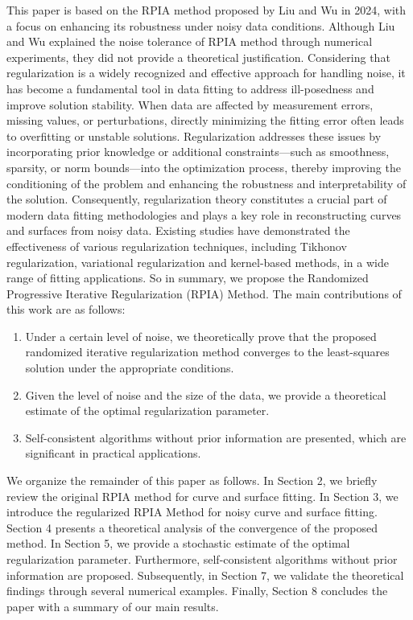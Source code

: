 \documentclass[11pt]{article}
\numberwithin{equation}{section}
\begin{document}
This paper is based on the RPIA method proposed by Liu and Wu\cite{WU2024128669} in 2024, with a focus on enhancing its robustness under noisy data conditions. Although Liu and Wu explained the noise tolerance of RPIA method through numerical experiments, they did not provide a theoretical justification. Considering that regularization is a widely recognized and effective approach for handling noise, it has become a fundamental tool in data fitting to address ill-posedness and improve solution stability\cite{MONTEGRANARIO2007583}. When data are affected by measurement errors, missing values, or perturbations, directly minimizing the fitting error often leads to overfitting or unstable solutions. Regularization addresses these issues by incorporating prior knowledge or additional constraints—such as smoothness, sparsity, or norm bounds—into the optimization process, thereby improving the conditioning of the problem and enhancing the robustness and interpretability of the solution. Consequently, regularization theory constitutes a crucial part of modern data fitting methodologies and plays a key role in reconstructing curves and surfaces from noisy data. Existing studies have demonstrated the effectiveness of various regularization techniques, including Tikhonov regularization\cite{Calvetti2025DistributedTR}, variational regularization\cite{Buccini2021AVN,Zhang2022ImpulseNI} and kernel-based methods\cite{Yin2020CurveFO}, in a wide range of fitting applications. So in summary, we propose the Randomized Progressive Iterative Regularization (RPIA) Method. The main contributions of this work are as follows:

\begin{enumerate}
\item Under a certain level of noise, we theoretically prove that the proposed randomized iterative regularization method converges to the least-squares solution under the appropriate conditions.
\item Given the level of noise and the size of the data, we provide a theoretical estimate of the optimal regularization parameter. 
\item Self-consistent algorithms without prior information are presented, which are significant in practical applications.
\end{enumerate}

We organize the remainder of this paper as follows. In Section 2, we briefly review the original RPIA method for curve and surface fitting. In Section 3, we introduce the  regularized RPIA Method for noisy curve and surface fitting. Section 4 presents a theoretical analysis of the convergence of the proposed method. In Section 5, we provide a stochastic estimate of the optimal regularization parameter. Furthermore, self-consistent algorithms without prior information are proposed. Subsequently, in Section 7, we validate the theoretical findings through several numerical examples. Finally, Section 8 concludes the paper with a summary of our main results.
\end{document}
